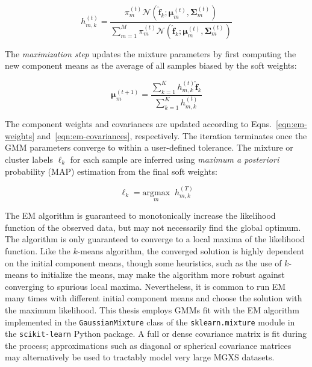 \begin{equation}
\label{eqn:em-posterior-probs}
h_{m,k}^{(t)} = \frac{\pi_{m}^{(t)} \mathcal{N}\left( \boldsymbol{\hat{f}}_{k}; \boldsymbol{\mu}_{m}^{(t)}, \boldsymbol{\Sigma}_{m}^{(t)} \right)}{\displaystyle\sum\limits_{m=1}^{M}\pi_{m}^{(t)} \mathcal{N}\left( \boldsymbol{\hat{f}}_{k}; \boldsymbol{\mu}_{m}^{(t)}, \boldsymbol{\Sigma}_{m}^{(t)} \right)}
\end{equation}

\noindent The \textit{maximization step} updates the mixture parameters by first computing the new component means as the average of all samples biased by the soft weights:

\begin{equation}
\label{eqn:em-means}
\boldsymbol{\mu}_{m}^{(t+1)} = \frac{\displaystyle\sum\limits_{k=1}^{K}h_{m,k}^{(t)}\boldsymbol{\hat{f}}_{k}}{\displaystyle\sum\limits_{k=1}^{K}h_{m,k}^{(t)}}
\end{equation}

\noindent The component weights and covariances are updated according to Eqns.~\ref{eqn:em-weights} and~\ref{eqn:em-covariances}, respectively. The iteration terminates once the \ac{GMM} parameters converge to within a user-defined tolerance. The mixture or cluster labels $\ell_{k}$ for each sample are inferred using \textit{maximum a posteriori} probability (MAP) estimation from the final soft weights:

\begin{equation}
\label{eqn:chap10-gmm-map}
\ell_{k} = \underset{m}{\text{argmax}} \;\; h_{m,k}^{(T)}
\end{equation}

The EM algorithm is guaranteed to monotonically increase the likelihood function of the observed data, but may not necessarily find the global optimum. The algorithm is only guaranteed to converge to a local maxima of the likelihood function. Like the $k$-means algorithm, the converged solution is highly dependent on the initial component means, though some heuristics, such as the use of $k$-means to initialize the means, may make the algorithm more robust against converging to spurious local maxima. Nevertheless, it is common to run EM many times with different initial component means and choose the solution with the maximum likelihood. This thesis employs \acp{GMM} fit with the EM algorithm implemented in the \texttt{GaussianMixture} class of the \texttt{sklearn.mixture} module in the \texttt{scikit-learn} Python package. A full or dense covariance matrix is fit during the process; approximations such as diagonal or spherical covariance matrices may alternatively be used to tractably model very large \ac{MGXS} datasets.


